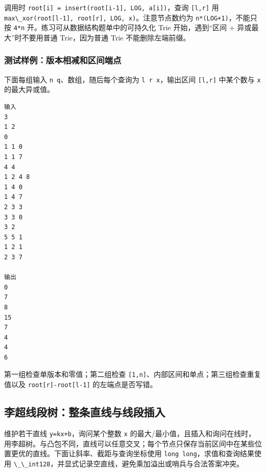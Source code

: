 调用时 \passthrough{\lstinline!root[i] = insert(root[i-1], LOG, a[i])!}，查询 \passthrough{\lstinline![l,r]!} 用 \passthrough{\lstinline!max\_xor(root[l-1], root[r], LOG, x)!}。注意节点数约为 \passthrough{\lstinline!n*(LOG+1)!}，不能只按 \passthrough{\lstinline!4*n!} 开。练习可从数据结构题单中的可持久化 Trie 开始，遇到``区间 + 异或最大''时不要用普通 Trie，因为普通 Trie 不能删除左端前缀。

\subsubsection{测试样例：版本相减和区间端点}

下面每组输入 \passthrough{\lstinline!n q!}、数组，随后每个查询为 \passthrough{\lstinline!l r x!}，输出区间 \passthrough{\lstinline![l,r]!} 中某个数与 \passthrough{\lstinline!x!} 的最大异或值。

\begin{lstlisting}
输入
3
1 2
0
1 1 0
1 1 7
4 4
1 2 4 8
1 4 0
1 4 7
2 3 3
3 3 0
3 2
5 5 1
1 2 1
2 3 7

输出
0
7
8
15
7
4
4
6
\end{lstlisting}

第一组检查单版本和零值；第二组检查 \passthrough{\lstinline![1,n]!}、内部区间和单点；第三组检查重复值以及 \passthrough{\lstinline!root[r]-root[l-1]!} 的左端点是否写错。


\subsection{李超线段树：整条直线与线段插入}

维护若干直线 \passthrough{\lstinline!y=kx+b!}，询问某个整数 \passthrough{\lstinline!x!} 的最大/最小值，且插入和询问在线时，用李超树。与凸包不同，直线可以任意交叉；每个节点只保存当前区间中在某些位置更优的直线。下面让斜率、截距与查询坐标使用 \passthrough{\lstinline!long long!}，求值和查询结果使用 \passthrough{\lstinline!\_\_int128!}，并显式记录空直线，避免乘加溢出或哨兵与合法答案冲突。

